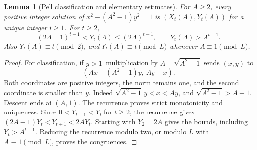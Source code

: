 \documentclass[11pt]{article}
\newtheorem{lemma}[theorem]{Lemma}
\begin{document}
\begin{lemma}[Pell classification and elementary estimates]\label{basic}
For \(A\ge2\), every positive integer solution of
\(x^2-(A^2-1)y^2=1\) is
\((X_t(A),Y_t(A))\) for a unique integer \(t\ge1\).
For \(t\ge2\),
\[
 (2A-1)^{t-1}<Y_t(A)\le(2A)^{t-1},\qquad
 Y_t(A)>A^{t-1}.
\]
Also \(Y_t(A)\equiv t\pmod2\), and
\(Y_t(A)\equiv t\pmod L\) whenever \(A\equiv1\pmod L\).
\end{lemma}
\begin{proof}
For classification, if \(y>1\), multiplication by
\(A-\sqrt{A^2-1}\) sends \((x,y)\) to
\[
       (Ax-(A^2-1)y,\ Ay-x).
\]
Both coordinates are positive integers, the norm remains one,
and the second coordinate is smaller than \(y\).  Indeed
\(\sqrt{A^2-1}\,y<x<Ay\), and \(\sqrt{A^2-1}>A-1\).
Descent ends at \((A,1)\).  The recurrence proves strict
monotonicity and uniqueness.  Since \(0<Y_{t-1}<Y_t\) for
\(t\ge2\), the recurrence gives
\((2A-1)Y_t<Y_{t+1}<2AY_t\).  Starting with \(Y_2=2A\)
gives the bounds, including \(Y_t>A^{t-1}\).
Reducing the recurrence modulo two, or modulo \(L\) with
\(A\equiv1\pmod L\), proves the congruences.
\end{proof}
\end{document}
